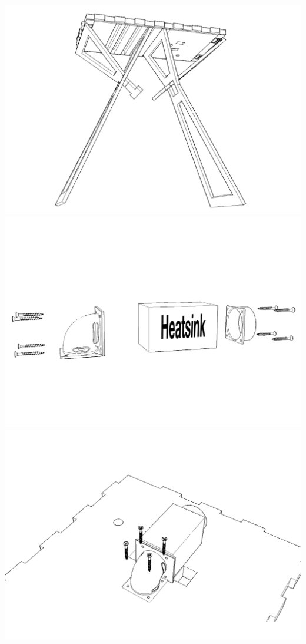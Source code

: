 \documentclass{article}
\begin{document}
\begin{center}
	\includegraphics[width=\hsize]{assembling/step4.png}
	\includegraphics[width=\hsize]{assembling/step5.png}
	\includegraphics[width=\hsize]{assembling/step6.png}

\end{center}
\end{document}
